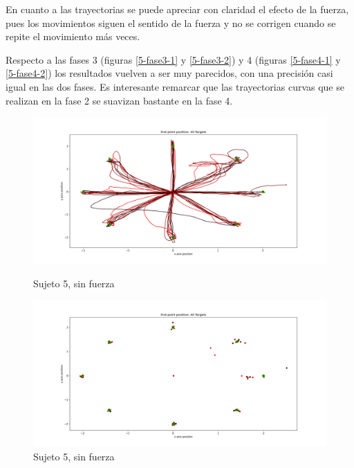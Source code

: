 \documentclass[a4paper,11pt, oneside]{book}
\begin{document}
En cuanto a las trayectorias se puede apreciar con claridad el efecto de la fuerza, pues los movimientos siguen el sentido de la fuerza y no se corrigen cuando se repite el movimiento más veces.

Respecto a las fases 3 (figuras \ref{5-fase3-1} y \ref{5-fase3-2}) y 4 (figuras \ref{5-fase4-1} y \ref{5-fase4-2}) los resultados vuelven a ser muy parecidos, con una precisión casi igual en las dos fases. Es interesante remarcar que las trayectorias curvas que se realizan en la fase 2 se suavizan bastante en la fase 4. 

\begin{figure}[H]
	\begin{minipage}[b]{0.5\linewidth}
		\centering
		\includegraphics[width=\linewidth]{sujeto5/no_force/trayectorias}
		\caption{Sujeto 5, sin fuerza}
		\label{5-fase1-1}
	\end{minipage}
	\hspace{0.5cm}
	\begin{minipage}[b]{0.5\linewidth}
		\centering
		\includegraphics[width=\linewidth]{sujeto5/no_force/trayectorias_puntos}
		\caption{Sujeto 5, sin fuerza}
		\label{5-fase1-2}
	\end{minipage}
\end{figure}
\end{document}
